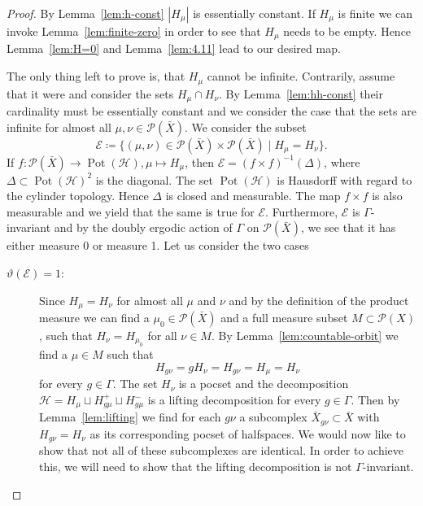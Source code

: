 \begin{proof}
  By Lemma~\ref{lem:h-const} \(|H_\mu|\) is essentially constant.
  If \(H_\mu\) is finite we can invoke Lemma~\ref{lem:finite-zero} in order to see that \(H_\mu\) needs to be empty. Hence Lemma~\ref{lem:H=0} and Lemma~\ref{lem:4.11} lead to our desired map.

  The only thing left to prove is, that \(H_\mu\) cannot be infinite. Contrarily, assume that it were and consider the sets \(H_\mu \cap H_\nu\). By Lemma~\ref{lem:hh-const} their cardinality must be essentially constant and we consider the case that the sets are infinite for almost all \(\mu, \nu \in \mathcal{P}(\bar X)\).
  We consider the subset
  \[
    \mathcal{E} \coloneqq \{(\mu, \nu) \in \mathcal{P}(\bar X) \times \mathcal{P}(\bar X)\mid H_\mu = H_\nu\}.
  \]
  If \(f\colon \mathcal{P}(\bar X) \to \operatorname{Pot}(\mathcal{H}), \mu \mapsto H_\mu\), then \(\mathcal{E} = (f \times f)^{-1}(\Delta)\), where \(\Delta \subset \operatorname{Pot}(\mathcal{H})^2\) is the diagonal. The set \(\operatorname{Pot}(\mathcal{H})\) is Hausdorff with regard to the cylinder topology. Hence \(\Delta\) is closed and measurable. The map \(f \times f\) is also measurable and we yield that the same is true for \(\mathcal{E}\). Furthermore, \(\mathcal{E}\) is \(\Gamma\)-invariant and by the doubly ergodic action of \(\Gamma\) on \(\mathcal{P}(\bar X)\), we see that it has either measure 0 or measure 1. Let us consider the two cases
  \begin{description}
  \item[\(\vartheta(\mathcal{E})=1\):] Since \(H_\mu = H_\nu\) for almost all \(\mu\) and \(\nu\) and by the definition of the product measure we can find a \(\mu_0 \in \mathcal{P}(\bar X)\) and a full measure subset \(M \subset \mathcal{P}(X)\), such that \(H_\nu = H_{\mu_0}\) for all \(\nu \in M\). By Lemma~\ref{lem:countable-orbit} we find a \(\mu \in M\) such that
    \[
      H_{g\nu} = gH_\nu = H_{g\nu} = H_\mu = H_\nu
    \]
    for every \(g \in \Gamma\). The set \(H_\nu\) is a pocset and the decomposition \(\mathcal{H} = H_\mu \sqcup H_{g\mu}^+ \sqcup H_{g\mu}^-\) is a lifting decomposition for every \(g \in \Gamma\). Then by Lemma~\ref{lem:lifting} we find for each \(g\nu\) a subcomplex \(\bar X_{g\nu} \subset \bar X\) with \(H_{g\nu} = H_\nu\) as its corresponding pocset of halfspaces. We would now like to show that not all of these subcomplexes are identical. In order to achieve this, we will need to show that the lifting decomposition is not \(\Gamma\)-invariant.


\end{description}
\end{proof}
